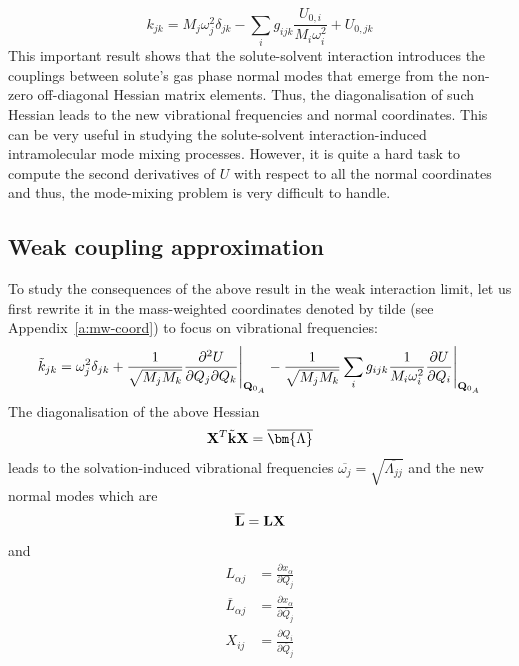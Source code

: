 \documentclass[a4paper,titlepage,twoside,fleqn,12pt]{book}
\newcommand{\BM}[1]{\bm{#1}}
\newcommand{\fderiv}[2]{\ensuremath{
    \frac{\partial #1}{\partial #2}}}
\newcommand{\sderivd}[3]{\ensuremath{
    \frac{\partial^2 #1}{\partial #2 \partial #3}
    }}
\begin{document}
\begin{refsection}
\begin{equation}
\boxed{
 k_{jk} = M_j \omega_j^2 \delta_{jk} - \sum_i g_{ijk} \frac{U_{0,i}}{M_i\omega_i^2} + U_{0,jk}
}
\end{equation}
%
This important result shows that the solute\hyp{}solvent interaction
introduces the couplings between solute's gas phase
normal modes that emerge from the non\hyp{}zero off\hyp{}diagonal
Hessian matrix elements. Thus, the diagonalisation of such
Hessian leads to the new vibrational frequencies and normal
coordinates. This can be very useful in studying the solute\hyp{}solvent 
interaction\hyp{}induced intramolecular mode
mixing processes. However, it is quite a hard task to 
compute the second derivatives of $U$
with respect to all the normal coordinates and thus, the mode\hyp{}mixing
problem is very difficult to handle. 

\subsection{Weak coupling approximation\label{s:wca}}

To study the consequences of the above result in the weak interaction
limit, let us first rewrite it
in the mass\hyp{}weighted
coordinates denoted by tilde (see Appendix~\ref{a:mw-coord}) to focus on vibrational
frequencies:
%
\begin{equation} 
 \tilde{k}_{jk} = \omega_j^2 \delta_{jk} + \frac{1}{\sqrt{M_jM_k}}\sderivd{U}{Q_j}{Q_k}  \Bigg|_{{\bf Q}_{0_A}} 
                           - \frac{1}{\sqrt{M_jM_k}}\sum_i g_{ijk} 
                             \frac{1}{M_i\omega_i^2}\fderiv{U}{Q_i}          \Bigg|_{{\bf Q}_{0_A}}        
\end{equation}
%
The diagonalisation of the above Hessian
%
\begin{equation} 
 {\bf X}^T \tilde{\bf k} {\bf X} = \overline{\BM\Lambda}
\end{equation}
%
leads to the solvation\hyp{}induced vibrational frequencies
$\overline{\omega_j}=\sqrt{\overline{\Lambda_{jj}}}$ 
and the new normal modes which are
%
\begin{equation} 
 \overline{\bf L}  = {\bf L} {\bf X}
\end{equation}
%
and
%
\begin{subequations} \label{eq:L-matrices}
 \begin{align}
            {L}_{\alpha j}  &= \fderiv{x_\alpha}{         {Q}_j} \\
   \overline{L}_{\alpha j}  &= \fderiv{x_\alpha}{\overline{Q}_j} \\
                  X_{ij}    &= \fderiv{Q_i}{\overline{Q}_j}
 \end{align}
\end{subequations}
%


\end{refsection}
\end{document}
